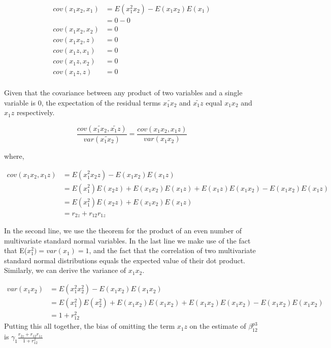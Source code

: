 \documentclass[12pt]{article}
\begin{document}
\begin{align*}
cov(x_1 x_2, x_1) &= E(x_1^2 x_2) - E(x_1 x_2) E(x_1) \\
&= 0 - 0 \\
cov(x_1 x_2, x_2) &= 0 \\
cov(x_1 x_2, z) &= 0 \\
cov(x_1 z, x_1) &= 0 \\
cov(x_1 z, x_2) &= 0 \\
cov(x_1 z, z) &= 0 \\
\end{align*}

Given that the covariance between any product of two variables and a single variable is $0$, the expectation of the residual terms $\widetilde{x_1 x_2}$ and $\widetilde{x_1 z}$ equal $x_1 x_2$ and $x_1 z$ respectively.

\begin{equation*}
\frac{cov(\widetilde{x_1 x_2}, \widetilde{x_1 z})}{var(\widetilde{x_1 x_2})} =
\frac{cov(x_1 x_2, x_1 z)}{var(x_1 x_2)} 
\end{equation*}

where,

\begin{align*}
cov(x_1 x_2, x_1 z) &= E(x_1^2 x_2 z) - E(x_1 x_2) E(x_1 z) \\
&= E(x_1^2) E(x_2 z) + E(x_1 x_2) E(x_1 z) + E(x_1 z) E(x_1 x_2) - E(x_1 x_2) E(x_1 z) \\
&= E(x_1^2) E(x_2 z) + E(x_1 x_2) E(x_1 z) \\
&= r_{2z} + r_{12} r_{1z}
\end{align*}

In the second line, we use the \citet{isserlis_formula_1918} theorem for the product of an even number of multivariate standard normal variables. In the last line we make use of the fact that E($x_1^2) = var(x_1) = 1$, and the fact that the correlation of two multivariate standard normal distributions equals the expected value of their dot product. Similarly, we can derive the variance of $x_1 x_2$. 

\begin{align*}
	var(x_1 x_2) &= E(x_1^2 x_2^2) - E(x_1 x_2) E(x_1 x_2) \\
	&= E(x^2_1) E(x^2_2) +  E(x_1 x_2) E(x_1 x_2) + E(x_1 x_2) E(x_1 x_2) - E(x_1 x_2) E(x_1 x_2) \\
	&= 1 + r^2_{12}
\end{align*}
Putting this all together, the bias of omitting the term $x_1 z$ on the estimate of $\beta^{p3}_{12}$ is  $\gamma_1 \frac{r_{2z} + r_{12} r_{1z}}{1 + r^2_{12}}$
\end{document}
